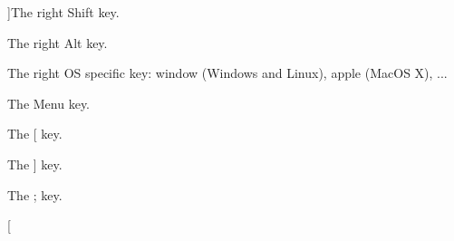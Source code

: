 \begin{Desc}
\begin{description}
{}]The right Shift key. \item[{\em 
\hypertarget{classsf_1_1_keyboard_acb4cacd7cc5802dec45724cf3314a142a21dcf098233296462bc7c632b93369cc}{R\-Alt}\label{classsf_1_1_keyboard_acb4cacd7cc5802dec45724cf3314a142a21dcf098233296462bc7c632b93369cc}
}]The right Alt key. \item[{\em 
\hypertarget{classsf_1_1_keyboard_acb4cacd7cc5802dec45724cf3314a142ac1b3fd7424feeda242cedbb64f3f5a7f}{R\-System}\label{classsf_1_1_keyboard_acb4cacd7cc5802dec45724cf3314a142ac1b3fd7424feeda242cedbb64f3f5a7f}
}]The right O\-S specific key\-: window (Windows and Linux), apple (Mac\-O\-S X), ... \item[{\em 
\hypertarget{classsf_1_1_keyboard_acb4cacd7cc5802dec45724cf3314a142a4aac50ce7c4923f96323fe84d592b139}{Menu}\label{classsf_1_1_keyboard_acb4cacd7cc5802dec45724cf3314a142a4aac50ce7c4923f96323fe84d592b139}
}]The Menu key. \item[{\em 
\hypertarget{classsf_1_1_keyboard_acb4cacd7cc5802dec45724cf3314a142afbe21cad5f264d685cf7f25060004184}{L\-Bracket}\label{classsf_1_1_keyboard_acb4cacd7cc5802dec45724cf3314a142afbe21cad5f264d685cf7f25060004184}
}]The \mbox{[} key. \item[{\em 
\hypertarget{classsf_1_1_keyboard_acb4cacd7cc5802dec45724cf3314a142a578253a70b48e61830aa08292d44680f}{R\-Bracket}\label{classsf_1_1_keyboard_acb4cacd7cc5802dec45724cf3314a142a578253a70b48e61830aa08292d44680f}
}]The \mbox{]} key. \item[{\em 
\hypertarget{classsf_1_1_keyboard_acb4cacd7cc5802dec45724cf3314a142a460ab09a36f9ed230504b89b9815de88}{Semi\-Colon}\label{classsf_1_1_keyboard_acb4cacd7cc5802dec45724cf3314a142a460ab09a36f9ed230504b89b9815de88}
}]The ; key. \item[{\em 
}
\end{description}
\end{Desc}
